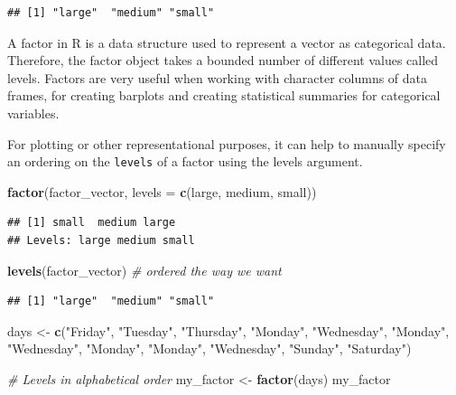 \documentclass[
]{book}
\newenvironment{Shaded}{\begin{snugshade}}{\end{snugshade}}
\newcommand{\AttributeTok}[1]{\textcolor[rgb]{0.13,0.29,0.53}{#1}}
\newcommand{\CommentTok}[1]{\textcolor[rgb]{0.56,0.35,0.01}{\textit{#1}}}
\newcommand{\FunctionTok}[1]{\textcolor[rgb]{0.13,0.29,0.53}{\textbf{#1}}}
\newcommand{\NormalTok}[1]{#1}
\newcommand{\OtherTok}[1]{\textcolor[rgb]{0.56,0.35,0.01}{#1}}
\newcommand{\StringTok}[1]{\textcolor[rgb]{0.31,0.60,0.02}{#1}}
\begin{document}
\begin{verbatim}
## [1] "large"  "medium" "small"
\end{verbatim}

A factor in R is a data structure used to represent a vector as categorical data. Therefore, the factor object takes a bounded number of different values called levels. Factors are very useful when working with character columns of data frames, for creating barplots and creating statistical summaries for categorical variables.

For plotting or other representational purposes, it can help to manually specify an ordering on the \texttt{levels} of a factor using the levels argument.

\begin{Shaded}
\begin{Highlighting}[]
\FunctionTok{factor}\NormalTok{(factor\_vector, }\AttributeTok{levels =} \FunctionTok{c}\NormalTok{(}\StringTok{\textquotesingle{}large\textquotesingle{}}\NormalTok{, }\StringTok{\textquotesingle{}medium\textquotesingle{}}\NormalTok{, }\StringTok{\textquotesingle{}small\textquotesingle{}}\NormalTok{))}
\end{Highlighting}
\end{Shaded}

\begin{verbatim}
## [1] small  medium large 
## Levels: large medium small
\end{verbatim}

\begin{Shaded}
\begin{Highlighting}[]
\FunctionTok{levels}\NormalTok{(factor\_vector) }\CommentTok{\# ordered the way we want}
\end{Highlighting}
\end{Shaded}

\begin{verbatim}
## [1] "large"  "medium" "small"
\end{verbatim}

\begin{Shaded}
\begin{Highlighting}[]
\NormalTok{days }\OtherTok{\textless{}{-}} \FunctionTok{c}\NormalTok{(}\StringTok{"Friday"}\NormalTok{, }\StringTok{"Tuesday"}\NormalTok{, }\StringTok{"Thursday"}\NormalTok{, }\StringTok{"Monday"}\NormalTok{, }\StringTok{"Wednesday"}\NormalTok{, }\StringTok{"Monday"}\NormalTok{,}
          \StringTok{"Wednesday"}\NormalTok{, }\StringTok{"Monday"}\NormalTok{, }\StringTok{"Monday"}\NormalTok{, }\StringTok{"Wednesday"}\NormalTok{, }\StringTok{"Sunday"}\NormalTok{, }\StringTok{"Saturday"}\NormalTok{)}

\CommentTok{\# Levels in alphabetical order}
\NormalTok{my\_factor }\OtherTok{\textless{}{-}} \FunctionTok{factor}\NormalTok{(days)}
\NormalTok{my\_factor}
\end{Highlighting}
\end{Shaded}
\end{document}
